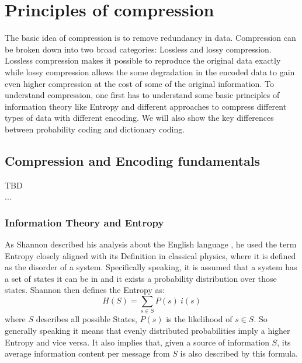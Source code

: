 
\chapter{Principles of compression}
\label{ch:Principles of compression}
\par{
The basic idea of compression is to remove redundancy in data. Compression can be broken down into two broad categories: Lossless and lossy compression. Lossless compression makes it possible to reproduce the original data exactly while lossy compression allows the some degradation in the encoded data to gain even higher compression at the cost of some of the original information. To understand compression, one first has to understand some basic principles of information theory like Entropy and different approaches to compress different types of data with different encoding. We will also show the key differences between probability coding and dictionary coding.}

\section{Compression and Encoding fundamentals}
\label{ch:Principles of compression:sec:Compression}
TBD\\
...

\subsection{Information Theory and Entropy}
\par{
As Shannon described his analysis about the English language \cite{entropy}, he used the term Entropy closely aligned with its Definition in classical physics, where it is defined as the disorder of a system. Specifically speaking, it is assumed that a system has a set of states it can be in and it exists a probability distribution over those states. Shannon then defines the Entropy as:
\[
H(S) = \sum_{s \in S} P(s) \: i(s)
\]
where $S$ describes all possible States, $P(s)$ is the likelihood of $s \in S$. So generally speaking it means that evenly distributed probabilities imply a higher Entropy and vice versa.
It also implies that, given a source of information $S$, its average information content per message from $S$ is also described by this formula.}

